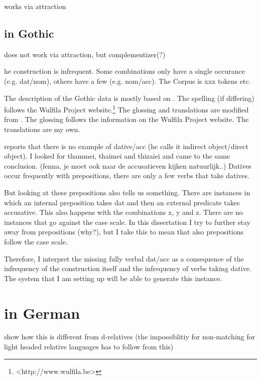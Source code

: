 works via attraction

\subsection{ in Gothic}

does not work via attraction, but complementizer(?)


he construction is infrequent. Some combinations only have a single occurance (e.g. dat/nom), others have a few (e.g. nom/acc). The Corpus is xxx tokens etc.

The description of the Gothic data is mostly based on \citealt{harbert1978}. The spelling (if differing) follows the Wulfila Project website.\footnote{
<http://www.wulfila.be>
} The glossing and translations are modified from \citeauthor{harbert1978}. The glossing follows the information on the Wulfila Project website. The translations are my own.

\citet{harbert1978} reports that there is no example of dative/acc (he calls it indirect object/direct object). I looked for thammei, thaimei and thizaiei and came to the same conclusion. (fenna, je moet ook naar de accusatieven kijken natuurlijk..) Datives occur frequently with prepositions, there are only a few verbs that take datives.

But looking at these prepositions also tells us something. There are instances in which an internal preposition takes dat and then an external predicate takes accusative. This also happens with the combinations x, y and z. There are no instances that go against the case scale. In this dissertation I try to further stay away from prepositions (why?), but I take this to mean that also prepositions follow the case scale.

Therefore, I interpret the missing fully verbal dat/acc as a consequence of the infrequency of the construction itself and the infrequency of verbs taking dative. The system that I am setting up will be able to generate this instance.





\section{ in German}

show how this is different from d-relatives (the impossiblitiy for non-matching for   light headed relative languages has to follow from this)








